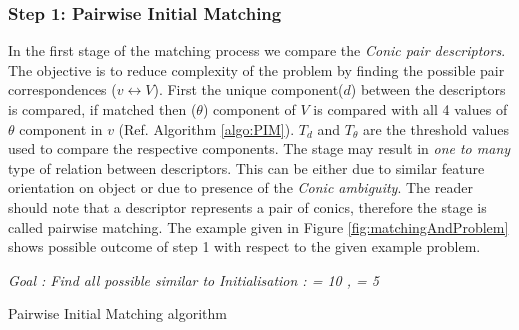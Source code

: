 \documentclass{bmvc2k}
\begin{document}
\subsubsection{Step 1: Pairwise Initial Matching}
\label{subsubSec:PIM}
In the first stage of the matching process we compare the \textit{Conic pair descriptors}.
The objective is to reduce complexity of the problem by finding the possible pair correspondences ($ v \leftrightarrow V $). 
First the unique component($ d $) between the descriptors is compared, if matched then ($ \theta $) component of $ V $ is compared with all 4 values of $ \theta $ component in $ v $ (Ref. Algorithm \ref{algo:PIM}). 
$ T_{d} $ and $ T_\theta $ are the threshold values used to compare the respective components. 
The stage may result in \textit{one to many} type of relation between descriptors. This can be either due to similar feature orientation on object or due to presence of the \textit{Conic ambiguity}. 
The reader should note that a descriptor represents a pair of conics, therefore the stage is called pairwise matching.
The example given in Figure \ref{fig:matchingAndProblem} shows possible outcome of step 1 with respect to the given example problem. 
\begin{algorithm}[tb] \label{algo:PIM}
\emph{Goal : Find all possible \threeDFv similar to \twoDFv} \;
\emph{Initialisation : \ThresholdD = 10 , \ThresholdA = 5} \; 
\caption{Pairwise Initial Matching algorithm}
\end{algorithm}

\end{document}
